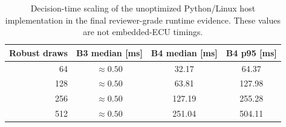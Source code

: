 \begin{table}[t]
\centering
\caption{Decision-time scaling of the unoptimized Python/Linux host implementation in the final reviewer-grade runtime evidence. These values are not embedded-ECU timings.}
\label{tab:runtime-scaling}
\begin{tabular}{rccc}
\hline
Robust draws & B3 median [ms] & B4 median [ms] & B4 p95 [ms]\\
\hline
64  & $\approx0.50$ & 32.17 & 64.37\\
128 & $\approx0.50$ & 63.81 & 127.98\\
256 & $\approx0.50$ & 127.19 & 255.28\\
512 & $\approx0.50$ & 251.04 & 504.11\\
\hline
\end{tabular}
\end{table}
